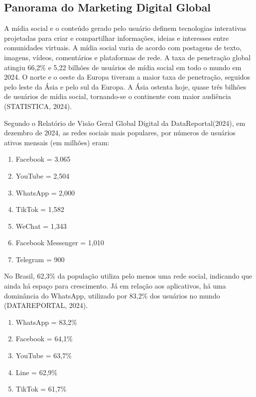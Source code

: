 \newpage
\subsection{Panorama do Marketing Digital Global}


A mídia social e o conteúdo gerado pelo usuário definem tecnologias interativas projetadas para criar e compartilhar informações, ideias e interesses entre comunidades virtuais. A mídia social varia de acordo com postagens de texto, imagens, vídeos, comentários e plataformas de rede. A taxa de penetração global atingiu 66,2\% e 5,22 bilhões de usuários de mídia social em todo o mundo em 2024. O norte e o oeste da Europa tiveram a maior taxa de penetração, seguidos pelo leste da Ásia e pelo sul da Europa. A Ásia ostenta hoje, quase três bilhões de usuários de mídia social, tornando-se o continente com maior audiência (STATISTICA, 2024).\vskip0.3cm

Segundo o Relatório de Visão Geral Global Digital da DataReportal(2024), em dezembro de 2024, as redes sociais mais populares, por números de usuários ativos mensais (em milhões) eram:


\begin{enumerate}
    \item Facebook = 3.065
    \item YouTube = 2,504
    \item WhatsApp = 2,000
    \item TikTok = 1,582
    \item WeChat = 1,343
    \item Facebook Messenger = 1,010
    \item Telegram = 900
\end{enumerate}

No Brasil, 62,3\% da população utiliza pelo menos uma rede social, indicando que ainda há espaço para crescimento. Já em relação aos aplicativos, há uma dominância do WhatsApp, utilizado por 83,2\% dos usuários no mundo (DATAREPORTAL, 2024). \vskip0.3cm

\begin{enumerate}
    \item WhatsApp = 83,2\%
    \item Facebook = 64,1\%   
    \item YouTube = 63,7\%
    \item Line = 62,9\%
    \item TikTok = 61,7\%
\end{enumerate}

\newpage

